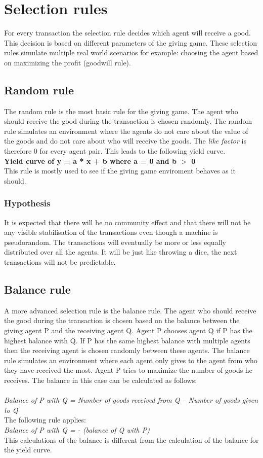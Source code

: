 \documentclass[twoside,openright]{uva-bachelor-thesis}
\begin{document}
\chapter{Selection rules}
For every transaction the selection rule decides which agent will receive a good. This decision is based on different parameters of the giving game. These selection rules simulate  multiple real world scenarios for example: choosing the agent based on maximizing the profit (goodwill rule).

\section{Random rule}
The random rule is the most basic rule for the giving game. The agent who should receive the good during the transaction is chosen randomly. The random rule simulates an environment where the agents do not care about the value of the goods and do not care about who will receive the goods. The \textit{like factor} is therefore 0 for every agent pair. This leads to the following yield curve.
\\
\textbf{Yield curve of y = a * x + b where a = 0 and b $>$ 0}
\\
This rule is mostly used to see if the giving game enviroment behaves as it should.

\subsection{Hypothesis}
It is expected that there will be no community effect and that there will not be any visible stabilisation of the transactions even though a machine is pseudorandom. The transactions will eventually be more or less equally distributed over all the agents. It will be just like throwing a dice, the next transactions will not be predictable. 

\section{Balance rule}
A more advanced selection rule is the balance rule. The agent who should receive the good during the transaction is chosen based on the balance between the giving agent P and the receiving agent Q. Agent P chooses agent Q if P has the highest balance with Q. If P has the same highest balance with multiple agents then the receiving agent is chosen randomly between these agents. The balance rule simulates an environment where each agent only gives to the agent from who they have received the most. Agent P tries to maximize the number of goods he receives. The balance in this case can be calculated as follows: 
\\
\\
\textit{Balance of P with Q = Number of goods received from Q – Number of goods given to Q} \\
The following rule applies:\\
\textit{Balance of P with Q = - (balance of Q with P)}\\
This calculations of the balance is different from the calculation of the balance for the yield curve.\\
\end{document}
